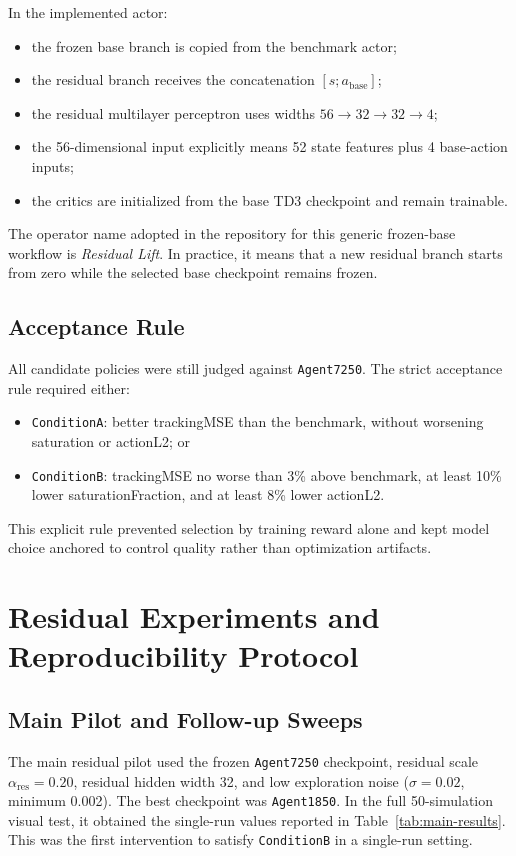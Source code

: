 \documentclass[conference]{IEEEtran}
\begin{document}
In the implemented actor:
\begin{itemize}
    \item the frozen base branch is copied from the benchmark actor;
    \item the residual branch receives the concatenation $[s; a_{\mathrm{base}}]$;
    \item the residual multilayer perceptron uses widths $56 \rightarrow 32 \rightarrow 32 \rightarrow 4$;
    \item the 56-dimensional input explicitly means 52 state features plus 4 base-action inputs;
    \item the critics are initialized from the base TD3 checkpoint and remain trainable.
\end{itemize}

The operator name adopted in the repository for this generic frozen-base workflow is \emph{Residual Lift}. In practice, it means that a new residual branch starts from zero while the selected base checkpoint remains frozen.

\subsection{Acceptance Rule}
All candidate policies were still judged against \texttt{Agent7250}. The strict acceptance rule required either:
\begin{itemize}
    \item \texttt{ConditionA}: better trackingMSE than the benchmark, without worsening saturation or actionL2; or
    \item \texttt{ConditionB}: trackingMSE no worse than 3\% above benchmark, at least 10\% lower saturationFraction, and at least 8\% lower actionL2.
\end{itemize}
This explicit rule prevented selection by training reward alone and kept model choice anchored to control quality rather than optimization artifacts.

\section{Residual Experiments and Reproducibility Protocol}
\subsection{Main Pilot and Follow-up Sweeps}
The main residual pilot used the frozen \texttt{Agent7250} checkpoint, residual scale $\alpha_{\mathrm{res}}=0.20$, residual hidden width 32, and low exploration noise ($\sigma = 0.02$, minimum 0.002). The best checkpoint was \texttt{Agent1850}. In the full 50-simulation visual test, it obtained the single-run values reported in Table~\ref{tab:main-results}. This was the first intervention to satisfy \texttt{ConditionB} in a single-run setting.
\end{document}
